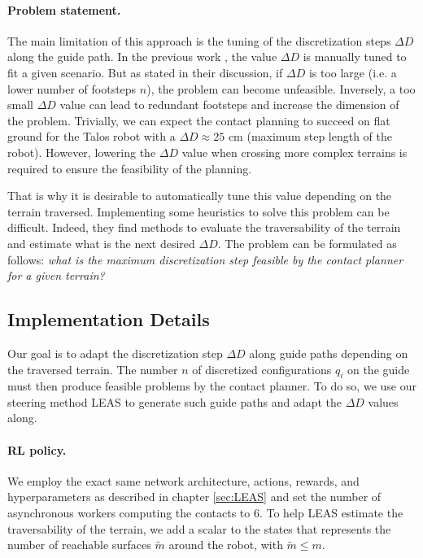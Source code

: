 \paragraph{Problem statement.}
The main limitation of this approach is the tuning of the discretization steps $\Delta D$ along the guide path.
In the previous work \cite{sl1m_v2}, the value $\Delta D$ is manually tuned to fit a given scenario.
But as stated in their discussion, if $\Delta D$ is too large (i.e. a lower number of footsteps $n$), the problem can become unfeasible. Inversely, a too small $\Delta D$ value can lead to redundant footsteps and increase the dimension of the problem.
Trivially, we can expect the contact planning to succeed on flat ground for the Talos robot with a $\Delta D \approx 25$ cm (maximum step length of the robot). However, lowering the $\Delta D$ value when crossing more complex terrains is required to ensure the feasibility of the planning.

That is why it is desirable to automatically tune this value depending on the terrain traversed.
Implementing some heuristics to solve this problem can be difficult. Indeed, they find methods to evaluate the traversability of the terrain and estimate what is the next desired $\Delta D$.
The problem can be formulated as follows: \textit{what is the maximum discretization step feasible by the contact planner for a given terrain?}


\subsection{Implementation Details\label{subsub:mip:implementation_details}}
Our goal is to adapt the discretization step $\Delta D$ along guide paths depending on the traversed terrain.
The number $n$ of discretized configurations $q_i$ on the guide must then produce feasible problems by the contact planner.
To do so, we use our steering method LEAS to generate such guide paths and adapt the $\Delta D$ values along.

\paragraph{RL policy.}
We employ the exact same network architecture, actions, rewards, and hyperparameters as described in chapter \ref{sec:LEAS} and set the number of asynchronous workers computing the contacts to 6.
To help LEAS estimate the traversability of the terrain, we add a scalar to the states that represents the number of reachable surfaces $\tilde{m}$ around the robot, with $\tilde{m} \leq m$.

